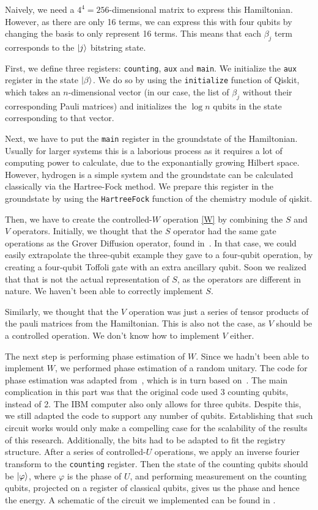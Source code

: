 \documentclass{article}
\begin{document}
Naively, we need a $4^4 = 256$-dimensional matrix to express this
Hamiltonian. However, as there are only 16 terms, we can express this
with four qubits by changing the basis to only represent 16 terms.
This means that each $\beta_j$ term corresponds to the $\ket{j}$
bitstring state.

First, we define three registers:  \verb|counting|, \verb|aux| and \verb|main|. We initialize the \verb|aux| register in the state $\ket{\beta}$. We do so by using the \verb|initialize| function of Qiskit, which takes an $n$-dimensional vector (in our case, the list of $\beta_j$ without their corresponding Pauli matrices) and initializes the $\log{n}$  qubits in the state corresponding to that vector.

Next, we have to put the \verb|main| register in the groundstate of the Hamiltonian. Usually for larger systems this is a laborious process as it requires a lot of computing power to calculate, due to the exponantially growing Hilbert space. However, hydrogen is a simple system and the groundstate can be  calculated classically via the Hartree-Fock method. We prepare this register in the groundstate by using the \verb|HartreeFock| function of the chemistry module of qiskit.

Then, we have to create the controlled-$W$ operation \cref{W} by combining the $S$ and $V$ operators. Initially, we thought that the $S$ operator had the same gate operations as the Grover Diffusion operator, found in~\cite{Qiskit-Textbook}. In that case, we could easily extrapolate the three-qubit example they gave to a four-qubit operation, by creating a four-qubit Toffoli gate with an extra ancillary qubit. Soon we realized that that is not the actual representation of $S$, as the operators are different in nature. We haven't been able to correctly implement $S$.

Similarly, we thought that the $V$ operation was just a series of tensor products of the pauli matrices from the Hamiltonian. This is also not the case, as $V$ should be a controlled operation. We don't know how to implement $V$ either.

The next step is performing phase estimation of $W$. Since we hadn't
been able to implement $W$, we performed phase estimation of a random
unitary. The code for phase estimation was adapted
from~\cite{Qiskit-Textbook}, which is in turn based
on~\textcite{nielsen}. The main complication in this part was that the
original code used 3 counting qubits, instead of 2. The IBM computer also
only allows for three qubits. Despite this, we still adapted the code
to support any number of qubits. Establishing that such circuit works
would only make a compelling case for the scalability of the results
of this research. Additionally, the bits had
to be adapted to fit the registry structure. After a series of
controlled-$U$ operations, we apply an inverse fourier transform to
the \verb|counting| register. Then the state of the counting qubits
should be $\ket{\varphi}$, where $\varphi$ is the phase of $U$, and performing measurement on the counting qubits, projected on a register of classical qubits, gives us the phase and hence the energy. A schematic of the circuit we implemented can be found in .
\end{document}
